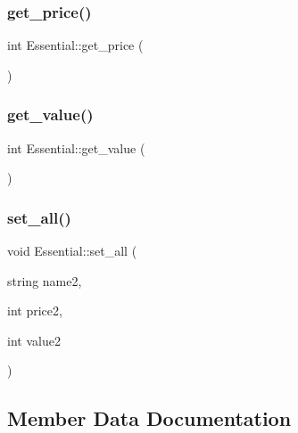 \mbox{\label{classEssential_a94f56c25d035a8644b3ef588faab1b8e}} 
\subsubsection{\texorpdfstring{get\+\_\+price()}{get\_price()}}
{\footnotesize\ttfamily int Essential\+::get\+\_\+price (\begin{DoxyParamCaption}{ }\end{DoxyParamCaption})}

\mbox{\label{classEssential_acb67326e6ff89e63176a51a22cad4aaa}} 
\subsubsection{\texorpdfstring{get\+\_\+value()}{get\_value()}}
{\footnotesize\ttfamily int Essential\+::get\+\_\+value (\begin{DoxyParamCaption}{ }\end{DoxyParamCaption})}

\mbox{\label{classEssential_ad8fbff7d58e0de81f1fb149b8bc2046b}} 
\subsubsection{\texorpdfstring{set\+\_\+all()}{set\_all()}}
{\footnotesize\ttfamily void Essential\+::set\+\_\+all (\begin{DoxyParamCaption}\item[{string}]{name2,  }\item[{int}]{price2,  }\item[{int}]{value2 }\end{DoxyParamCaption})}



\subsection{Member Data Documentation}
\mbox{\label{classEssential_a9dda661085733a2fc48f5b6a52645cf1}} 
